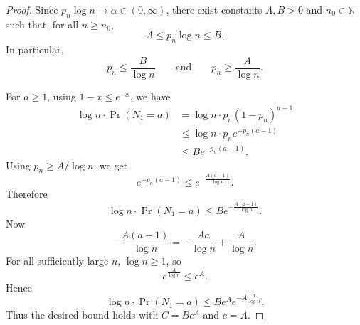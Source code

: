 \documentclass[journal,letterpaper,onecolumn,11pt]{IEEEtran}
\begin{document}
\begin{proof}
Since \(p_n\log n\to \alpha\in(0,\infty)\), there exist constants
\(A,B>0\) and \(n_0\in\mathbb N\) such that, for all \(n\ge n_0\),
\[
    A \le p_n\log n \le B.
\]
In particular,
\[
    p_n\le \frac{B}{\log n}
    \qquad\text{and}\qquad
    p_n\ge \frac{A}{\log n}.
\]

For \(a\ge 1\), using \(1-x\le e^{-x}\), we have
\[
\begin{aligned}
    \log n\cdot \Pr(N_1=a)
    &= \log n\cdot p_n(1-p_n)^{a-1} \\
    &\le \log n\cdot  p_n e^{-p_n(a-1)} \\
    &\le B e^{-p_n(a-1)}.
\end{aligned}
\]
Using \(p_n\ge A/\log n\), we get
\[
    e^{-p_n(a-1)}
    \le
    e^{-\frac{A(a-1)}{\log n}}.
\]
Therefore
\[
    \log n\cdot \Pr(N_1=a)
    \le
    Be^{-\frac{A(a-1)}{\log n}}.
\]
Now
\[
    -\frac{A(a-1)}{\log n}
    =
    -\frac{Aa}{\log n}+\frac{A}{\log n}.
\]
For all sufficiently large \(n\), \(\log n\ge 1\), so
\[
    e^{\frac{A}{\log n}}\le e^A.
\]
Hence
\[
    \log n\cdot \Pr(N_1=a)
    \le
    Be^A
    e^{-A\frac{a}{\log n}}.
\]
Thus the desired bound holds with $C=Be^A$ and $c=A$.
\end{proof}
\end{document}
